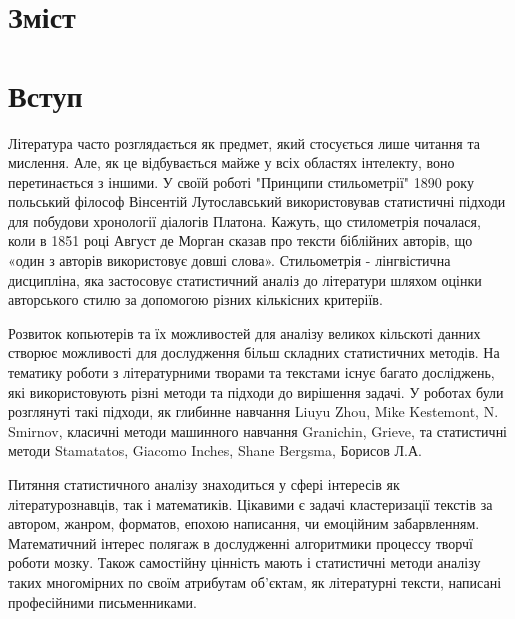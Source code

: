 \documentclass[12pt, a4paper]{extarticle}
\begin{document}
\section{Зміст}
\tableofcontents
\newpage
\section{Вступ}
Література часто розглядається як предмет, який стосується лише читання та мислення. Але, як це відбувається майже у всіх областях інтелекту, воно перетинається з іншими. У своїй роботі "Принципи стильометрії" 1890 року польський філософ Вінсентій Лутославський використовував статистичні підходи для побудови хронології діалогів Платона. Кажуть, що стилометрія почалася, коли в 1851 році Август де Морган сказав про тексти біблійних авторів, що «один з авторів використовує довші слова». Стильометрія - лінгвістична дисципліна, яка застосовує статистичний аналіз до літератури шляхом оцінки авторського стилю за допомогою різних кількісних критеріїв. 

Розвиток копьютерів та їх можливостей для аналізу великох кільскоті данних створює можливості для дослудження більш складних статистичних методів. На тематику роботи з літературними творами та текстами існує багато
досліджень, які використовують різні методи та підходи до вирішення задачі. У роботах були розглянуті такі підходи, як глибинне навчання Liuyu Zhou\cite{NewsAuthorshipIdentificationwithDeepLearning},
Mike Kestemont\cite{OverviewoftheAuthorIdentificationTaskatPAN2018}, N. Smirnov\cite{Tableforestimatingthegoodnessoffitofempiricaldistributions}, класичні методи машинного навчання
Granichin\cite{WritingstyledeterminationusingtheKNNtextmodel}, Grieve\cite{QuantitativeauthorshipattributionAnevaluationoftechniques}, та статистичні методи Stamatatos\cite{Asurveyofmodernauthorshipattributionmethods}, Giacomo Inches\cite{FindingParticipantsinaChatAuthorshipAttributionforConversationalDocuments},
Shane Bergsma\cite{StylometricAnalysisofScientificArticles}, Борисов Л.А\cite{IdentificationAuthorByFrequencies}.

Питяння статистичного аналізу знаходиться у сфері інтересів як літературознавців, так і математиків. Цікавими є задачі кластеризації текстів за автором, жанром, форматов, епохою написання, чи емоційним забарвленням. Математичний інтерес полягаж в дослудженні алгоритмики процессу творчї роботи мозку. Також самостійну цінність мають і статистичні методи аналізу таких многомірних по своїм атрибутам об'єктам, як літературні тексти, написані професійними письменниками.
\end{document}
